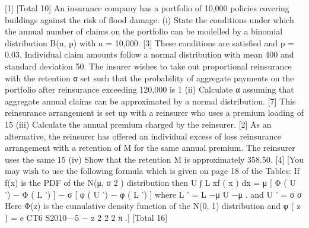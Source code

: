 [1]
[Total 10]
An insurance company has a portfolio of 10,000 policies covering buildings against
the risk of flood damage.
(i)
State the conditions under which the annual number of claims on the portfolio
can be modelled by a binomial distribution B(n, p) with n = 10,000.
[3]
These conditions are satisfied and p = 0.03. Individual claim amounts follow a
normal distribution with mean 400 and standard deviation 50. The insurer wishes to
take out proportional reinsurance with the retention α set such that the probability of
aggregate payments on the portfolio after reinsurance exceeding 120,000 is 1%
(ii)
Calculate α assuming that aggregate annual claims can be approximated by a
normal distribution.
[7]
This reinsurance arrangement is set up with a reinsurer who uses a premium loading
of 15%
(iii)
Calculate the annual premium charged by the reinsurer.
[2]
As an alternative, the reinsurer has offered an individual excess of loss reinsurance
arrangement with a retention of M for the same annual premium. The reinsurer uses
the same 15%
(iv)
Show that the retention M is approximately 358.50.
[4]
[You may wish to use the following formula which is given on page 18 of the Tables:
If f(x) is the PDF of the N(μ, σ 2 ) distribution then
U
∫ L
xf ( x ) dx = μ [ Φ ( U ') − Φ ( L ') ] − σ [ φ ( U ') − φ ( L ') ]
where L ' =
L −μ
U −μ
.
and U ' =
σ
σ
Here Φ(z) is the cumulative density function of the N(0, 1) distribution and
φ ( z ) =
e
CT6 S2010—5
−
z 2
2
2 π
.]
[Total 16]








